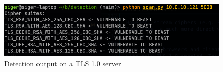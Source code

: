 \documentclass{acm_proc_article-sp}
\begin{document}
\begin{figure}[htb]
    \centering
    \includegraphics[keepaspectratio, width=\linewidth]{./figures/detection-output.png}
    \caption{Detection output on a TLS 1.0 server}
\end{figure}


%
%
\balancecolumns
\appendix
\balancecolumns
\end{document}
